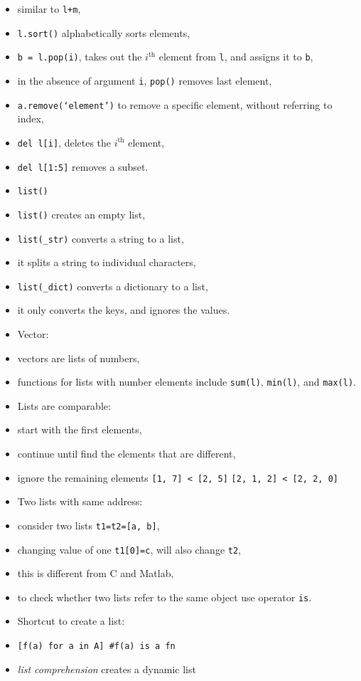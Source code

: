 \documentclass[onecolumn]{IEEEtran} %
\begin{document}
\begin{itemize}
        \bi
            \item similar to \verb|l+m|,
        \ei
        \item \verb|l.sort()| alphabetically sorts elements,
        \item \verb|b = l.pop(i)|, takes out the $i^\text{th}$ element from \verb|l|, and assigns it to \verb|b|,
        \bi
            \item in the absence of argument \verb|i|, \verb|pop()| removes last element,
        \ei
        \item \verb|a.remove(‘element’)| to remove a specific element, without referring to index,
        \item \verb|del l[i]|, deletes the $i^\text{th}$ element,
        \item \verb|del l[1:5]| removes a subset.
    \ei
    \item \verb|list()|
    \bi
        \item \verb|list()| creates an empty list,
        \item \verb|list(_str)| converts a string to a list,
        \bi
            \item it splits a string to individual characters,
        \ei
        \item \verb|list(_dict)| converts a dictionary to a list,
        \bi
            \item it only converts the keys, and ignores the values.
        \ei
    \ei
    \item Vector:
    \bi
        \item vectors are lists of numbers,
        \item functions for lists with number elements include \verb|sum(l)|, \verb|min(l)|, and \verb|max(l)|.
    \ei
     \item Lists are comparable:
    \bi
        \item start with the first elements,
        \item continue until find the elements that are different,
        \item ignore the remaining elements \newline \verb|[1, 7] < [2, 5]| \newline \verb|[2, 1, 2] < [2, 2, 0]|
    \ei
    \item Two lists with same address:
    \bi
        \item consider two lists \verb|t1=t2=[a, b]|,
        \item changing value of one \verb|t1[0]=c|, will also change \verb|t2|,
        \item this is different from C and Matlab,
        \item to check whether two lists refer to the same object use operator \verb|is|.
    \ei
    \item Shortcut to create a list:
    \bi
        \item \verb|[f(a) for a in A] #f(a) is a fn|
        \item \emph{list comprehension} creates a dynamic list
    \ei
\end{itemize}
\end{document}
